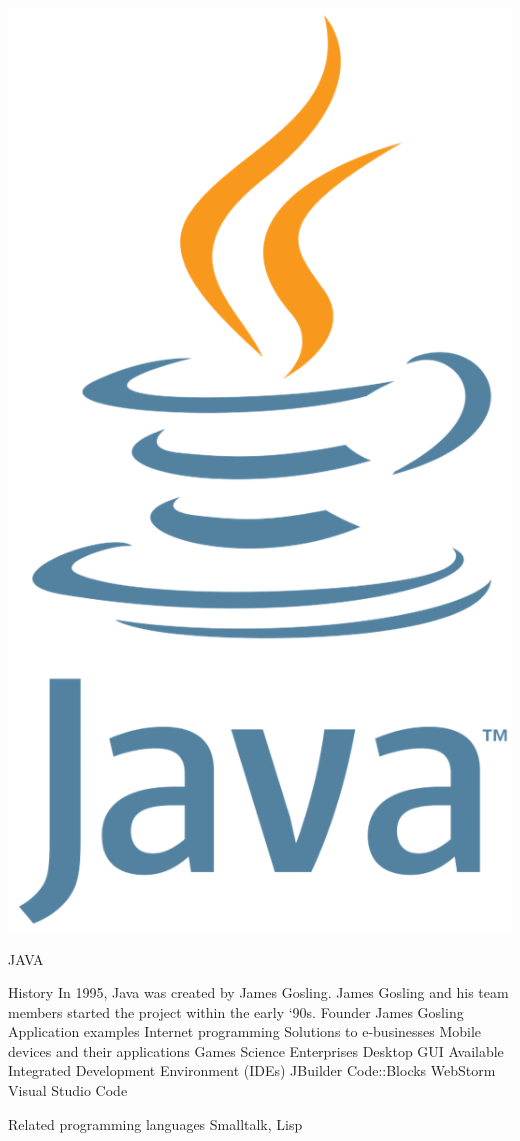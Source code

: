 \documentclass{article}
\begin{document}
{\newpage
\includegraphics[width=\linewidth,height=\linewidth]{Picture3.png}
\centering
\begin{tcolorbox}[width=\linewidth,colback={blue},outer arc=0mm,colupper=white]    
	\huge JAVA
\end{tcolorbox} 

\newpage
History
In 1995, Java was created by James Gosling. James Gosling and his team members started the project within the early ‘90s.
Founder
James Gosling
Application examples
Internet programming
Solutions to e-businesses
Mobile devices and their applications
Games
Science
Enterprises
Desktop GUI
Available Integrated Development Environment (IDEs) 
JBuilder
Code::Blocks
WebStorm
Visual Studio Code

Related programming languages
Smalltalk, Lisp

}
\end{document}

